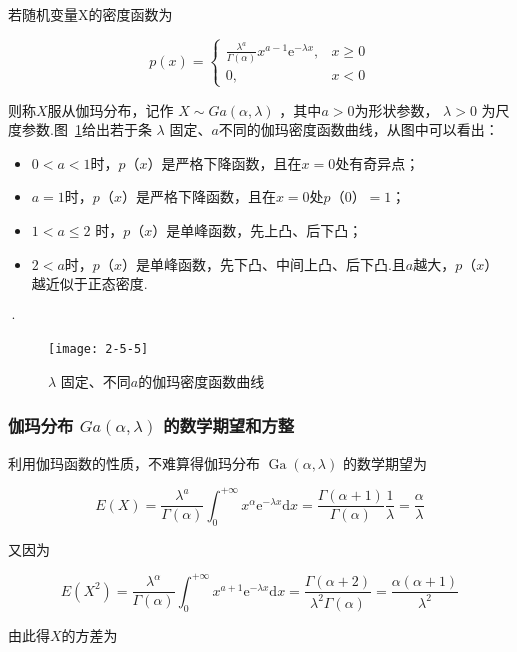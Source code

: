 若随机变量X的密度函数为

\begin{equation}
p(x)=\left\{\begin{array}{ll}{\frac{\lambda^{a}}{\Gamma(\alpha)} x^{a-1} \mathrm{e}^{-\lambda x},} & {x \geqslant 0} \\ {0,} & {x<0}\end{array}\right. \label{eq:2.5.12}
\end{equation}

则称$ X $服从伽玛分布，记作 $X \sim G a(\alpha, \lambda)$ ，其中$ a>0 $为形状参数， $\lambda>0$ 为尺度参数.图~\ref{fig:2-5-5}给出若于条 $\lambda$ 固定、$ a $不同的伽玛密度函数曲线，从图中可以看出：

\begin{itemize}
	\item $ 0<a<1 $时，$ p（x） $是严格下降函数，且在$ x=0 $处有奇异点；
	\item $ a=1 $时，$ p（x） $是严格下降函数，且在$ x=0 $处$ p（0）=1 $；
	\item $1<a \leq 2$ 时，$ p（x） $是单峰函数，先上凸、后下凸；
	\item $ 2<a $时，$ p（x） $是单峰函数，先下凸、中间上凸、后下凸.且$ a $越大，$ p（x） $越近似于正态密度.
\end{itemize}
·
\begin{figure}
	\centering
	\texttt{[image: 2-5-5]}
	\caption{$\lambda$ 固定、不同$ a $的伽玛密度函数曲线}
	\label{fig:2-5-5}
\end{figure}

\subsubsection{伽玛分布 $G a(\alpha, \lambda)$ 的数学期望和方整}

利用伽玛函数的性质，不难算得伽玛分布 $\operatorname{Ga}(\alpha, \lambda)$ 的数学期望为

\[
E(X)=\frac{\lambda^{a}}{\Gamma(\alpha)} \int_{0}^{+\infty} x^{\alpha} \mathrm{e}^{-\lambda x} \mathrm{d} x=\frac{\Gamma(\alpha+1)}{\Gamma(\alpha)} \frac{1}{\lambda}=\frac{\alpha}{\lambda}
\]

又因为

\[
E\left(X^{2}\right)=\frac{\lambda^{\alpha}}{\Gamma(\alpha)} \int_{0}^{+\infty} x^{a+1} \mathrm{e}^{-\lambda x} \mathrm{d} x=\frac{\Gamma(\alpha+2)}{\lambda^{2} \Gamma(\alpha)}=\frac{\alpha(\alpha+1)}{\lambda^{2}}
\]

由此得$ X $的方差为

